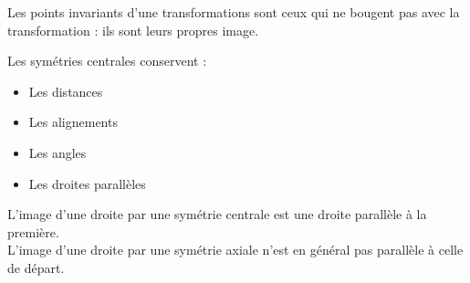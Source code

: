 {Les points invariants d'une transformations sont ceux qui ne bougent pas avec la transformation : ils sont leurs propres image.}


{Les symétries centrales conservent :
\begin{itemize}
    \item Les distances
    \item Les alignements
    \item Les angles
    \item Les droites parallèles
\end{itemize}
}

{L'image d'une droite par une symétrie centrale est une droite parallèle à la première.\\
L'image d'une droite par une symétrie axiale n'est en général pas parallèle à celle de départ.}

